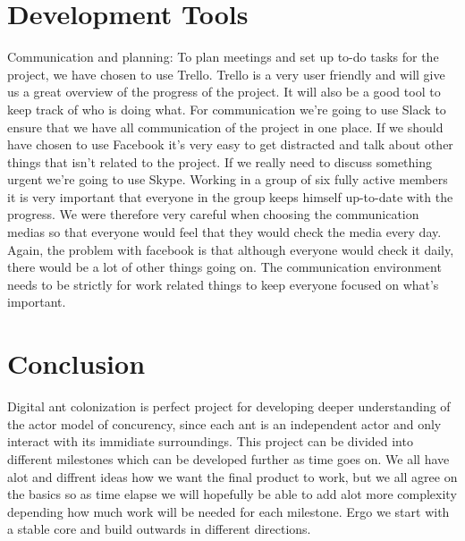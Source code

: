\documentclass[a4paper]{article}
\begin{document}
\section{Development Tools}
Communication and planning: To plan meetings and set up to-do tasks for the
project, we have chosen to use Trello. Trello is a very user friendly and will
give us a great overview of the progress of the project. It will also be a good
tool to keep track of who is doing what. For communication we’re going to use
Slack to ensure that we have all communication of the project in one place. If
we should have chosen to use Facebook it’s very easy to get distracted and talk
about other things that isn’t related to the project. If we really need to discuss
something urgent we’re going to use Skype. Working in a group of six fully active members
it is very important that everyone in the group keeps himself up-to-date with the progress. 
We were therefore very careful when choosing the communication medias so that everyone would
feel that they would check the media every day. Again, the problem with facebook is that 
although everyone would check it daily, there would be a lot of other things going on.
The communication environment needs to be strictly for work related things to keep everyone
focused on what's important. 


\section{Conclusion}
Digital ant colonization is perfect project for developing deeper understanding
of the actor model of concurency, since each ant is an independent actor and
only interact with its immidiate surroundings. This project can be divided into
different milestones which can be developed further as time goes on. We all have
alot and diffrent ideas how we want the final product to work, but we all agree
on the basics so as time elapse we will hopefully be able to add alot more
complexity depending how much work will be needed for each milestone. Ergo we
start with a stable core and build outwards in different directions.
\end{document}
